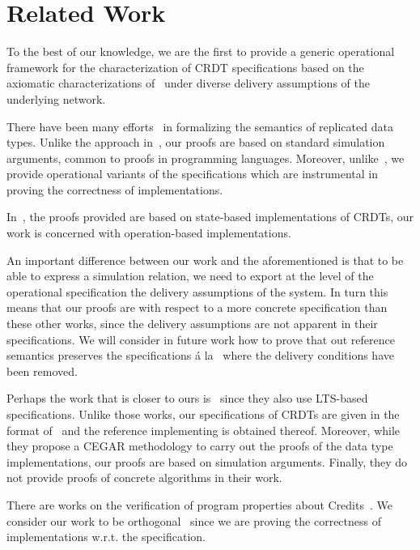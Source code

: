\section{Related Work}
\label{sec:related-work}

To the best of our knowledge, we are the first to provide a generic
operational framework for the characterization of CRDT specifications
based on the axiomatic characterizations of~\cite{Burckhardt:2014}
under diverse delivery assumptions of the underlying network.
%

There have been many
efforts~\cite{Burckhardt:2014,Burckhardt:2014b,ZellerBP14,MukundRS15}
in formalizing the semantics of replicated data types.
%
Unlike the approach in~\cite{Burckhardt:2014,Burckhardt:2014b}, our
proofs are based on standard simulation arguments, common to proofs in
programming languages.
%
Moreover, unlike~\cite{Burckhardt:2014,Burckhardt:2014b}, we provide
operational variants of the specifications which are instrumental in
proving the correctness of implementations.

In~\cite{ZellerBP14}, the proofs provided are based on state-based
implementations of CRDTs, our work is concerned with operation-based
implementations.

An important difference between our work and the aforementioned is
that to be able to express a simulation relation, we need to export at
the level of the operational specification the delivery assumptions of
the system.
%
In turn this means that our proofs are with respect to a more concrete
specification than these other works, since the delivery assumptions
are not apparent in their specifications.
%
We will consider in future work how to prove that out reference
semantics preserves the specifications \'a la~\cite{Burckhardt:2014}
where the delivery conditions have been removed.
%

Perhaps the work that is closer to ours is~\cite{MukundRS15,MukundRS15b} 
since they also use LTS-based specifications. 
Unlike those works, our specifications of CRDTs are given in the
format of~\cite{Burckhardt:2014} and the reference implementing is
obtained thereof.
%
Moreover, while they propose a CEGAR methodology to carry out the
proofs of the data type implementations, our proofs are based on
simulation arguments.
%
Finally, they do not provide proofs of concrete algorithms in their
work. 

There are works on the verification of program properties about
Credits~\cite{GotsmanYFNS16}.
%
We consider our work to be orthogonal~\cite{GotsmanYFNS16} since we
are proving the correctness of implementations w.r.t. the
specification. 

